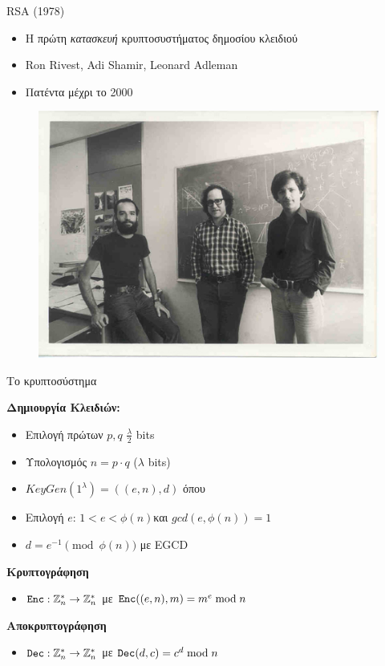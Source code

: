 \documentclass[handout]{beamer}
\begin{document}
\begin{frame}{RSA (1978)}
\begin{itemize}
\item Η πρώτη \emph{κατασκευή} κρυπτοσυστήματος δημοσίου κλειδιού
\item Ron Rivest, Adi Shamir, Leonard Adleman
\item Πατέντα μέχρι το 2000
\end{itemize}

\begin{figure}
\includegraphics[scale=0.8]{rsa-photo.jpg}  
\end{figure}
\end{frame}

\begin{frame}{Το κρυπτοσύστημα}

 
\textbf{Δημιουργία Κλειδιών:}
\begin{itemize}
\item Επιλογή πρώτων $p,q$ $\frac{\lambda}{2}$ bits \pause
\item Υπολογισμός $n=p \cdot q$ ($\lambda$ bits) \pause
\item $KeyGen(1^{\lambda}) = ((e,n),d)$ όπου \pause
\item Επιλογή $e$: $1 < e < \phi(n)$και $gcd(e,\phi(n))=1$ \pause
\item $d = e^{-1} \pmod{\phi(n)}$ \pause με EGCD
\end{itemize}
\pause
\textbf{Κρυπτογράφηση} 
\begin{itemize}
\item $\mathtt{Enc} : \mathbb{Z}^*_n \rightarrow \mathbb{Z}^*_n$ με \pause $\mathtt{Enc}((e,n), m) = m^e \bmod n$
\end{itemize}
\pause
\textbf{Αποκρυπτογράφηση}
\begin{itemize}
\item $\mathtt{Dec} : \mathbb{Z}^*_n \rightarrow \mathbb{Z}^*_n$ με \pause $\mathtt{Dec}(d, c) = c^d \bmod n$
\end{itemize} 
\end{frame}
\end{document}
